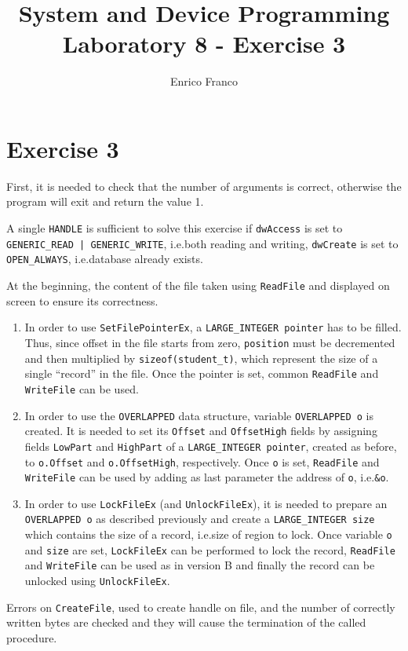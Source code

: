 \documentclass{report}
\author{Enrico Franco}
\title{System and Device Programming \\
	Laboratory 8 - Exercise 3}
\begin{document}
\section*{Exercise 3}

First, it is needed to check that the number of arguments is correct, otherwise
the program will exit and return the value 1.

A single \texttt{HANDLE} is sufficient to solve this exercise if \texttt{dwAccess} is set to \texttt{GENERIC\_READ | GENERIC\_WRITE}, i.e.\@ both reading and writing, \texttt{dwCreate} is set to \texttt{OPEN\_ALWAYS}, i.e.\@ database already exists.

At the beginning, the content of the file taken using \texttt{ReadFile} and displayed on screen to ensure its correctness.

\begin{enumerate}[label=Version \Alph*]
\item In order to use \texttt{SetFilePointerEx}, a \texttt{LARGE\_INTEGER pointer} has to be filled. Thus, since offset in the file starts from zero, \texttt{position} must be decremented and then multiplied by \texttt{sizeof(student\_t)}, which represent the size of a single ``record'' in the file. Once the pointer is set, common \texttt{ReadFile} and \texttt{WriteFile} can be used.
\item In order to use the \texttt{OVERLAPPED} data structure, variable \texttt{OVERLAPPED o} is created. It is needed to set its \texttt{Offset} and \texttt{OffsetHigh} fields by assigning fields \texttt{LowPart} and \texttt{HighPart} of a \texttt{LARGE\_INTEGER pointer}, created as before, to \texttt{o.Offset} and \texttt{o.OffsetHigh}, respectively. Once \texttt{o} is set, \texttt{ReadFile} and \texttt{WriteFile} can be used by adding as last parameter the address of \texttt{o}, i.e.\@ \texttt{\&o}.
\item In order to use \texttt{LockFileEx} (and \texttt{UnlockFileEx}), it is needed to prepare an \texttt{OVERLAPPED o} as described previously and create a \texttt{LARGE\_INTEGER size} which contains the size of a record, i.e.\@ size of region to lock. Once variable \texttt{o} and \texttt{size} are set, \texttt{LockFileEx} can be performed to lock the record, \texttt{ReadFile} and \texttt{WriteFile} can be used as in version B and finally the record can be unlocked using \texttt{UnlockFileEx}.
\end{enumerate}

Errors on \texttt{CreateFile}, used to create handle on file, and the number of correctly written bytes are checked and they will cause the termination of the called procedure.
\end{document}
